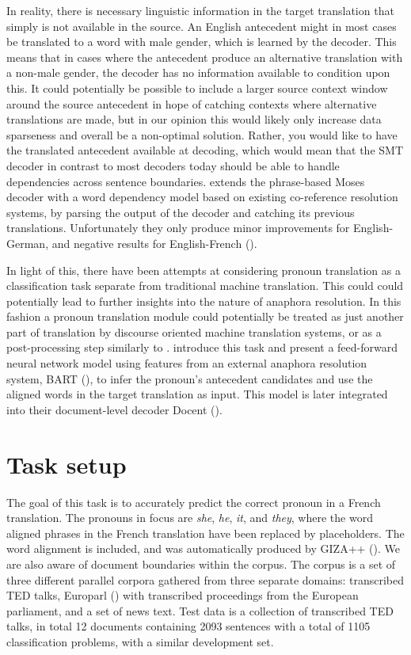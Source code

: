 \documentclass[11pt]{article}
\begin{document}
In reality, there is necessary linguistic information in the target translation that simply is not available in the source.
An English antecedent might in most cases be translated to a word with male gender, which is learned by the decoder.
This means that in cases where the antecedent produce an alternative translation with a non-male gender, the decoder has no information available to condition upon this.
It could potentially be possible to include a larger source context window around the source antecedent in hope of catching contexts where alternative translations are made, but in our opinion this would likely only increase data sparseness and overall be a non-optimal solution.
Rather, you would like to have the translated antecedent available at decoding, which would mean that the SMT decoder in contrast to most decoders today should be able to handle dependencies across sentence boundaries.
\textcite{Hardmeier2010Modelling} extends the phrase-based Moses decoder with a word dependency model based on existing co-reference resolution systems, by parsing the output of the decoder and catching its previous translations.
Unfortunately they only produce minor improvements for English-German, and negative results for English-French (\cite{Hardmeier2011UppsalaFbk}).

In light of this, there have been attempts at considering pronoun translation as a classification task separate from traditional machine translation.
This could  could potentially lead to further insights into the nature of anaphora resolution.
In this fashion a pronoun translation module could potentially be treated as just another part of translation by discourse oriented machine translation systems, or as a post-processing step similarly to \textcite{Guillou2012Improving}.
\textcite{Hardmeier2013Latent} introduce this task and present a feed-forward neural network model using features from an external anaphora resolution system, BART (\cite{Broscheit2010Bart}), to infer the pronoun's antecedent candidates and use the aligned words in the target translation as input. This model is later integrated into their document-level decoder Docent (\cite{Hardmeier2014Discourse,Hardmeier2013Docent}).

\section{Task setup}

The goal of this task is to accurately predict the correct pronoun in a French translation.
The pronouns in focus are \emph{she}, \emph{he}, \emph{it}, and \emph{they}, where the word aligned phrases in the French translation have been replaced by placeholders.
The word alignment is included, and was automatically produced by GIZA++ (\cite{Och2003Giza}).
We are also aware of document boundaries within the corpus.
The corpus is a set of three different parallel corpora gathered from three separate domains:
transcribed TED talks, Europarl (\cite{Koehn2005Europarl}) with transcribed proceedings from the European parliament, and a set of news text.
Test data is a collection of transcribed TED talks, in total 12 documents containing 2093 sentences with a total of 1105 classification problems, with a similar development set.
\end{document}
